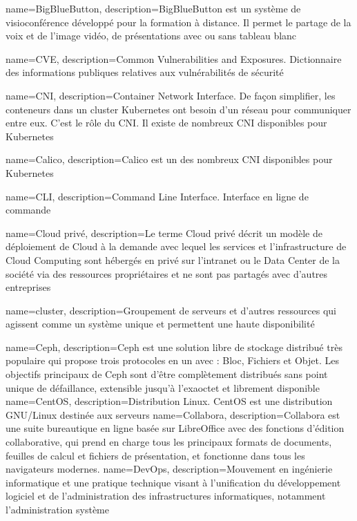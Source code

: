 {
    name=BigBlueButton,
    description={BigBlueButton est un système de visioconférence développé pour la formation à distance. Il permet le partage de la voix et de l'image vidéo, de présentations avec ou sans tableau blanc}
}

{
    name=CVE,
    description={Common Vulnerabilities and Exposures. Dictionnaire des informations publiques relatives aux vulnérabilités de sécurité}
}

{
    name=CNI,
    description={Container Network Interface. De façon simplifier, les conteneurs dans un cluster Kubernetes ont besoin d'un réseau pour communiquer entre eux. C'est le rôle du CNI. Il existe de nombreux CNI disponibles pour Kubernetes}
}

{
    name=Calico,
    description={Calico est un des nombreux CNI disponibles pour Kubernetes}
}

{
    name=CLI,
    description={Command Line Interface. Interface en ligne de commande}
}

{
    name=Cloud privé,
    description={Le terme Cloud privé décrit un modèle de déploiement de Cloud à la demande avec lequel les services et l'infrastructure de Cloud Computing sont hébergés en privé sur l'intranet ou le Data Center de la société via des ressources propriétaires et ne sont pas partagés avec d'autres entreprises}
}

{
    name=cluster,
    description={Groupement de serveurs et d’autres ressources qui agissent comme un système unique et permettent une haute disponibilité}
}

{
    name=Ceph,
    description={Ceph est une solution libre de stockage distribué très populaire qui propose trois protocoles en un avec : Bloc, Fichiers et Objet. Les objectifs principaux de Ceph sont d'être complètement distribués sans point unique de défaillance, extensible jusqu'à l'exaoctet et librement disponible}
}
{
    name=CentOS,
    description={Distribution Linux. CentOS est une distribution GNU/Linux destinée aux serveurs}
}
{
    name=Collabora,
    description={Collabora est une suite bureautique en ligne basée sur LibreOffice avec des fonctions d'édition collaborative, qui prend en charge tous les principaux formats de documents, feuilles de calcul et fichiers de présentation, et fonctionne dans tous les navigateurs modernes.}
}
{
    name=DevOps,
    description={Mouvement en ingénierie informatique et une pratique technique visant à l'unification du développement logiciel et de l'administration des infrastructures informatiques, notamment l'administration système}
}

